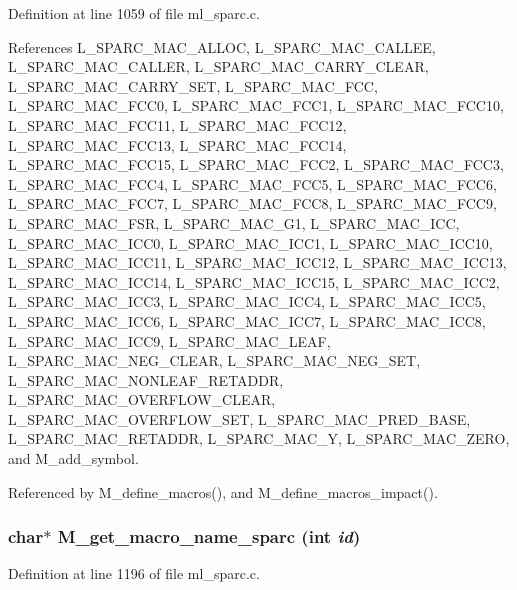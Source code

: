 Definition at line 1059 of file ml\_\-sparc.c.

References L\_\-SPARC\_\-MAC\_\-ALLOC, L\_\-SPARC\_\-MAC\_\-CALLEE, L\_\-SPARC\_\-MAC\_\-CALLER, L\_\-SPARC\_\-MAC\_\-CARRY\_\-CLEAR, L\_\-SPARC\_\-MAC\_\-CARRY\_\-SET, L\_\-SPARC\_\-MAC\_\-FCC, L\_\-SPARC\_\-MAC\_\-FCC0, L\_\-SPARC\_\-MAC\_\-FCC1, L\_\-SPARC\_\-MAC\_\-FCC10, L\_\-SPARC\_\-MAC\_\-FCC11, L\_\-SPARC\_\-MAC\_\-FCC12, L\_\-SPARC\_\-MAC\_\-FCC13, L\_\-SPARC\_\-MAC\_\-FCC14, L\_\-SPARC\_\-MAC\_\-FCC15, L\_\-SPARC\_\-MAC\_\-FCC2, L\_\-SPARC\_\-MAC\_\-FCC3, L\_\-SPARC\_\-MAC\_\-FCC4, L\_\-SPARC\_\-MAC\_\-FCC5, L\_\-SPARC\_\-MAC\_\-FCC6, L\_\-SPARC\_\-MAC\_\-FCC7, L\_\-SPARC\_\-MAC\_\-FCC8, L\_\-SPARC\_\-MAC\_\-FCC9, L\_\-SPARC\_\-MAC\_\-FSR, L\_\-SPARC\_\-MAC\_\-G1, L\_\-SPARC\_\-MAC\_\-ICC, L\_\-SPARC\_\-MAC\_\-ICC0, L\_\-SPARC\_\-MAC\_\-ICC1, L\_\-SPARC\_\-MAC\_\-ICC10, L\_\-SPARC\_\-MAC\_\-ICC11, L\_\-SPARC\_\-MAC\_\-ICC12, L\_\-SPARC\_\-MAC\_\-ICC13, L\_\-SPARC\_\-MAC\_\-ICC14, L\_\-SPARC\_\-MAC\_\-ICC15, L\_\-SPARC\_\-MAC\_\-ICC2, L\_\-SPARC\_\-MAC\_\-ICC3, L\_\-SPARC\_\-MAC\_\-ICC4, L\_\-SPARC\_\-MAC\_\-ICC5, L\_\-SPARC\_\-MAC\_\-ICC6, L\_\-SPARC\_\-MAC\_\-ICC7, L\_\-SPARC\_\-MAC\_\-ICC8, L\_\-SPARC\_\-MAC\_\-ICC9, L\_\-SPARC\_\-MAC\_\-LEAF, L\_\-SPARC\_\-MAC\_\-NEG\_\-CLEAR, L\_\-SPARC\_\-MAC\_\-NEG\_\-SET, L\_\-SPARC\_\-MAC\_\-NONLEAF\_\-RETADDR, L\_\-SPARC\_\-MAC\_\-OVERFLOW\_\-CLEAR, L\_\-SPARC\_\-MAC\_\-OVERFLOW\_\-SET, L\_\-SPARC\_\-MAC\_\-PRED\_\-BASE, L\_\-SPARC\_\-MAC\_\-RETADDR, L\_\-SPARC\_\-MAC\_\-Y, L\_\-SPARC\_\-MAC\_\-ZERO, and M\_\-add\_\-symbol.

Referenced by M\_\-define\_\-macros(), and M\_\-define\_\-macros\_\-impact().
\subsubsection{\setlength{\rightskip}{0pt plus 5cm}char$\ast$ M\_\-get\_\-macro\_\-name\_\-sparc (int {\em id})}\label{m__sparc_8h_61872011cd25f3037443e7f3bef8625d}




Definition at line 1196 of file ml\_\-sparc.c.

